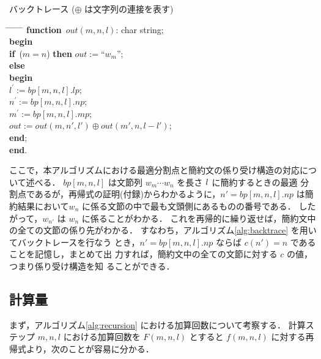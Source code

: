 \begin{algorithm}{バックトレース}\label{alg:backtrace}
 \rm
 ($\oplus$ は文字列の連接を表す)
 \begin{tabbing}
  \hspace*{5mm} \= \hspace*{3mm} \= \hspace*{3mm} \= \hspace*{3mm} \=
  \hspace*{3mm} \= \hspace*{3mm} \= \hspace*{3mm} \+ \kill
    {\bf function}\ $out(m, n, l)$: char string; \+ \\
      {\bf begin}\\
      {\bf if}\ ($m=n$) {\bf then} $out:= $``$w_{m}$'';\\
      {\bf else}\\
      {\bf begin} \+ \\
         $l^{\prime}:= bp[m, n, l].lp$;\\
         $n^{\prime}:= bp[m, n, l].np$;\\
         $m^{\prime}:= bp[m, n, l].mp$;\\
         $out:=out(m, n',l') \oplus out(m', n, l-l')$; \- \\
     {\bf end}; \- \\  
     {\bf end}.
\end{tabbing}
\end{algorithm}

ここで，本アルゴリズムにおける最適分割点と簡約文の係り受け構造の対応につ
いて述べる．
$bp[m,n,l]$ は文節列 $w_m \cdots w_n$ を長さ $l\/$ に簡約するときの最適
分割点であるが，再帰式の証明(付録)からわかるように，$ n'= bp[m,n,l].np$ 
は簡約結果において$w_n$ に係る文節の中で最も文頭側にあるものの番号である．
したがって，$w_{n'}$ は $w_n$ に係ることがわかる．
これを再帰的に繰り返せば，簡約文中の全ての文節の係り先がわかる．
すなわち，アルゴリズム\ref{alg:backtrace} を用いてバックトレースを行なう
とき，$n'=bp[m,n,l].np$ ならば $c(n')=n$ であることを記憶し，まとめて出
力すれば，簡約文中の全ての文節に対する $c$ の値，つまり係り受け構造を知
ることができる．

\subsection{計算量}

まず，アルゴリズム\ref{alg:recursion} における加算回数について考察する．
計算ステップ $m, n, l$ における加算回数を $F(m, n, l)$ とすると $f(m, n,
l)$ に対する再帰式より，次のことが容易に分かる．

